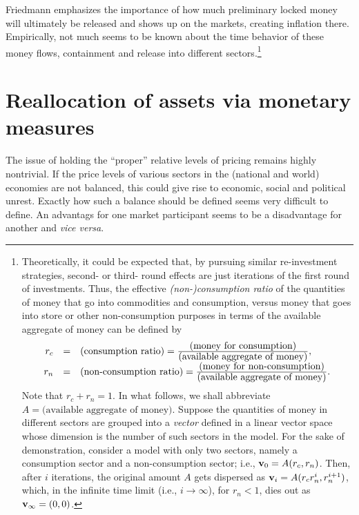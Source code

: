 \documentclass[aps,rmp,preprint,amsfonts,showpacs,showkeys]{revtex4}
\begin{document}
Friedmann \cite[Section~1(f)]{Friedman-2008} emphasizes the importance of how much preliminary locked money
will ultimately be released and shows up on the markets, creating inflation there.
Empirically, not much seems to be known about the time behavior of these money flows, containment and  release into different sectors.\footnote{
Theoretically, it could be expected that, by pursuing similar re-investment strategies,
second- or third- round effects are just iterations of the first round of investments.
Thus,  the effective {\em (non-)consumption ratio} of the quantities of money that go into commodities and consumption,
versus money that goes into store or other non-consumption purposes in terms of the available aggregate of  money can be defined by
$$
\begin{array}{rcl}
r_c&=&\mbox{(consumption ratio)}
 =
{
\mbox{(money for consumption)}
\over
\mbox{(available aggregate of money)}
}
,\\
r_n&=&
\mbox{(non-consumption ratio)}
=
{
\mbox{(money for non-consumption)}
\over
\mbox{(available aggregate of money)}
}
.
\end{array}
$$
Note that $r_c+r_n=1$. In what follows, we shall abbreviate $A= \mbox{(available aggregate of money)}$.
Suppose the quantities of money in different sectors are grouped into a {\em vector}
defined in a linear vector space whose dimension is the number of such sectors in the model.
For the sake of demonstration, consider a model with only two sectors, namely a consumption sector
and a non-consumption sector; i.e.,
${\bf v}_0=A(r_c,r_n)$.
Then, after $i$ iterations, the original amount $A$ gets dispersed as
${\bf v}_i=A(r_c r_n^i,r_n^{i+1})
$,
which, in the infinite time limit (i.e., $i\rightarrow \infty$), for $r_n<1$, dies out as
${\bf v}_\infty = (0,0)$.
}


\section{Reallocation of assets via monetary measures}

The issue of holding the ``proper'' relative levels of pricing remains highly nontrivial.
If the price levels of various sectors in the (national and world) economies are not balanced,
this could give rise to economic, social and political unrest.
Exactly how such a balance should be defined seems very difficult to define.
An advantags for one market participant seems to be a disadvantage for another and {\em vice versa}.
\end{document}
